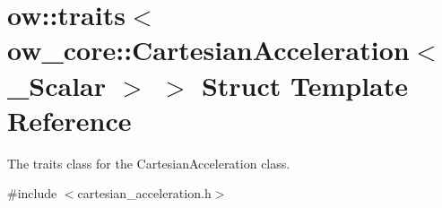 \hypertarget{structow_1_1traits_3_01ow__core_1_1CartesianAcceleration_3_01__Scalar_01_4_01_4}{}\section{ow\+:\+:traits$<$ ow\+\_\+core\+:\+:Cartesian\+Acceleration$<$ \+\_\+\+Scalar $>$ $>$ Struct Template Reference}
\label{structow_1_1traits_3_01ow__core_1_1CartesianAcceleration_3_01__Scalar_01_4_01_4}


The traits class for the Cartesian\+Acceleration class.  




{\ttfamily \#include $<$cartesian\+\_\+acceleration.\+h$>$}

